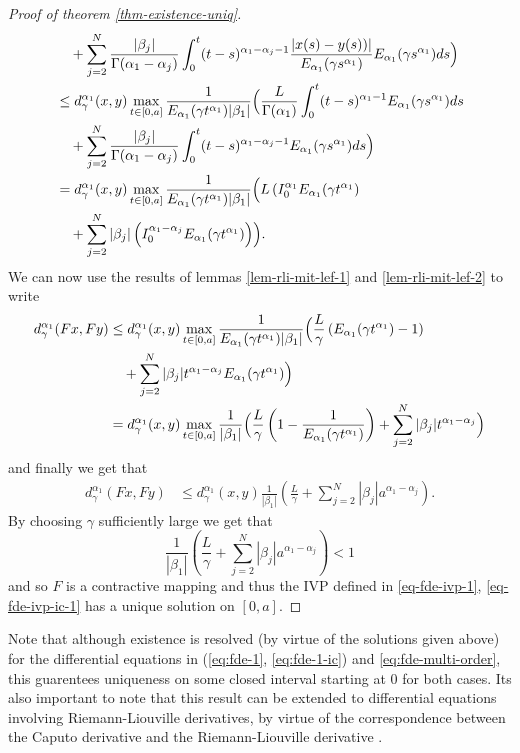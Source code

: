 \begin{proof}[Proof of theorem \ref{thm-existence-uniq}]
\begin{align}
			& \ \ \ + \sum_{j=2}^N \frac{|\beta_j|}{\Gamma(\alpha_1 - \alpha_j)} \int_0^t (t-s)^{\alpha_1 - \alpha_j - 1}\frac{|x(s) - y(s))|}{E_{\alpha_1}(\gamma s^{\alpha_1})}E_{\alpha_1}(\gamma s^{\alpha_1}) ds \Bigr) \\
			&\leq d_\gamma^{\alpha_1}(x,y) \max_{t \in [0, a]} \frac{1}{E_{\alpha_1}(\gamma t^{\alpha_1})|\beta_1|} \Bigl(
			\frac{L}{\Gamma(\alpha_1)}\int_0^t (t-s)^{\alpha_1 - 1} E_{\alpha_1}(\gamma s^{\alpha_1}) ds \\
			& \ \ \ + \sum_{j=2}^N \frac{|\beta_j|}{\Gamma(\alpha_1 - \alpha_j)} \int_0^t (t-s)^{\alpha_1 - \alpha_j - 1}E_{\alpha_1}(\gamma s^{\alpha_1}) ds \Bigr) \\
			&= d_\gamma^{\alpha_1}(x,y) \max_{t \in [0, a]} \frac{1}{E_{\alpha_1}(\gamma t^{\alpha_1})|\beta_1|} \Bigl(
			L \left( I_{0}^{\alpha_1} E_{\alpha_1}(\gamma t^{\alpha_1} \right) \\
			& \ \ \ + \sum_{j=2}^N |\beta_j| \left( I_{0}^{\alpha_1 - \alpha_j} E_{\alpha_1}(\gamma t^{\alpha_1}) \right) \Bigr). \\
	\end{align}
	We can now use the results of lemmas \ref{lem-rli-mit-lef-1} and \ref{lem-rli-mit-lef-2} to write
	\begin{align}
		d_\gamma^{\alpha_1}(Fx,Fy) &\leq d_\gamma^{\alpha_1}(x,y) \max_{t \in [0, a]} \frac{1}{E_{\alpha_1}(\gamma t^{\alpha_1})|\beta_1|} \Bigl(
			\frac{L}{\gamma}\left( E_{\alpha_1}(\gamma t^{\alpha_1}) - 1 \right) \\
			& \ \ \ + \sum_{j=2}^N |\beta_j| t^{\alpha_1 - \alpha_j} E_{\alpha_1}(\gamma t^{\alpha_1}) \Bigr) \\
			&= d_\gamma^{\alpha_1}(x,y) \max_{t \in [0, a]} \frac{1}{|\beta_1|} \Bigl(
			\frac{L}{\gamma}\left( 1- \frac{1}{E_{\alpha_1}(\gamma t^{\alpha_1})} \right) + \sum_{j=2}^N |\beta_j| t^{\alpha_1 - \alpha_j}\Bigr) \\
	\end{align}
	and finally we get that 
	\begin{align}
		d_\gamma^{\alpha_1}(Fx,Fy) &\leq d_\gamma^{\alpha_1}(x,y) \frac{1}{|\beta_1|}\left( \frac{L}{\gamma} + \sum_{j=2}^N |\beta_j| a^{\alpha_1 - \alpha_j} \right).
	\end{align}
	By choosing $ \gamma $ sufficiently large we get that 
	$$
		\frac{1}{|\beta_1|}\left( \frac{L}{\gamma} + \sum_{j=2}^N |\beta_j| a^{\alpha_1 - \alpha_j} \right) < 1
	$$
	and so $ F $ is a contractive mapping and thus the IVP defined in \eqref{eq-fde-ivp-1}, \eqref{eq-fde-ivp-ic-1} has a unique solution on $ [0, a] $.
\end{proof}

Note that although existence is resolved (by virtue of the solutions given above)
for the differential equations in (\ref{eq:fde-1}, \ref{eq:fde-1-ic}) and \ref{eq:fde-multi-order}, this 
guarentees uniqueness on some closed interval starting at $ 0 $ for both cases. Its also important
to note that this result can be extended to differential equations involving Riemann-Liouville derivatives, by 
virtue of the correspondence between the Caputo derivative and the Riemann-Liouville derivative \cite{Podlubny1999}. 
